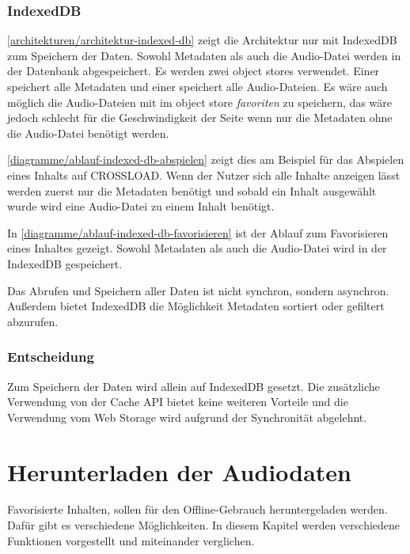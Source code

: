 \subsubsection{IndexedDB}

\autoref{architekturen/architektur-indexed-db} zeigt die Architektur nur mit IndexedDB zum Speichern der Daten. Sowohl Metadaten als auch die Audio-Datei werden in der Datenbank abgespeichert. Es werden zwei object stores verwendet. Einer speichert alle Metadaten und einer speichert alle Audio-Dateien. Es wäre auch möglich die Audio-Dateien mit im object store \textit{favoriten} zu speichern, das wäre jedoch schlecht für die Geschwindigkeit der Seite wenn nur die Metadaten ohne die Audio-Datei benötigt werden.

\autoref{diagramme/ablauf-indexed-db-abspielen} zeigt dies am Beispiel für das Abspielen eines Inhalts auf CROSSLOAD. Wenn der Nutzer sich alle Inhalte anzeigen lässt werden zuerst nur die Metadaten benötigt und sobald ein Inhalt ausgewählt wurde wird eine Audio-Datei zu einem Inhalt benötigt. 


In \autoref{diagramme/ablauf-indexed-db-favorisieren} ist der Ablauf zum Favorisieren eines Inhaltes gezeigt. Sowohl Metadaten als auch die Audio-Datei wird in der IndexedDB gespeichert.


Das Abrufen und Speichern aller Daten ist nicht synchron, sondern asynchron. Außerdem bietet IndexedDB die Möglichkeit Metadaten sortiert oder gefiltert abzurufen.

\subsubsection{Entscheidung}
Zum Speichern der Daten wird allein auf IndexedDB gesetzt. Die zusätzliche Verwendung von der Cache \ac{API} bietet keine weiteren Vorteile und die Verwendung vom Web Storage wird aufgrund der Synchronität abgelehnt.  

\clearpage

\section{Herunterladen der Audiodaten}
Favorisierte Inhalten, sollen für den Offline-Gebrauch heruntergeladen werden. Dafür gibt es verschiedene Möglichkeiten. In diesem Kapitel werden verschiedene Funktionen vorgestellt und miteinander verglichen. 

